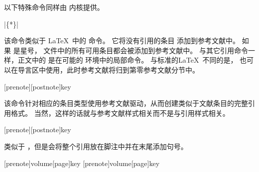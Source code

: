 
以下特殊命令同样由 \biblatex 内核提供。

\begin{ltxsyntax}

|\{*\}|


该命令类似于 \LaTeX\ 中的  命令。
它将没有引用的条目  添加到参考文献中。
如果  是星号， 文件中的所有可用条目都会被添加到参考文献中。
与其它引用命令一样，正文中的  是在可能的  环境中的局部命令。
与标准的\LaTeX\ 不同的是， 也可以在导言区中使用，此时参考文献将归到第零参考文献分节中。

[prenote][postnote]{key}


该命令针对相应的条目类型使用参考文献驱动，从而创建类似于文献条目的完整引用格式。
当然，这样的话就与参考文献样式相关而不是与引用样式相关。

[prenote][postnote]{key}


类似于 ，但是会将整个引用放在脚注中并在末尾添加句号。

[prenote]{volume}[page]{key}
[prenote]{volume}[page]{key}



\end{ltxsyntax}
